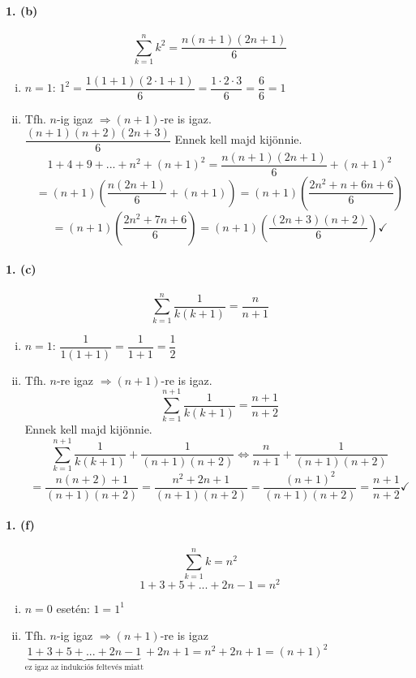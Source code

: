 \documentclass[12pt,a4paper,fleqn]{article}
\newcommand{\myparagraph}[1]{\paragraph{#1}\mbox{}}
\begin{document}
\myparagraph{1. (b)}
\[ \sum_{k=1}^{n} k^2 = \dfrac{n(n+1)(2n+1)}{6} \]
\begin{enumerate}[i.]
  \item $n=1$: $1^2 = \dfrac{1(1+1)(2 \cdot 1 + 1)}{6} = \dfrac{1 \cdot 2 \cdot 3}{6}
    = \dfrac{6}{6} = 1$ \checkmark
  \item Tfh. $n$-ig igaz $\Rightarrow (n+1)$-re is igaz. \\[1.2em]
  $ \dfrac{(n+1)(n+2)(2n+3)}{6} $ Ennek kell majd kijönnie.
  \[ 1 + 4 + 9 + ... + n^2 + (n+1)^2 = \dfrac{n(n+1)(2n+1)}{6} + (n+1)^2 \]
  \[ = (n+1) \left( \dfrac{n(2n+1)}{6} + (n+1) \right) = (n+1) \left( \dfrac{2n^2+n+6n+6}{6} \right) \]
  \[
    = (n+1) \left( \dfrac{2n^2+7n+6}{6} \right)
    = (n+1) \left( \dfrac{(2n+3)(n+2)}{6} \right) \checkmark
  \]
\end{enumerate}


\myparagraph{1. (c)}
\[ \sum_{k=1}^{n} \dfrac{1}{k(k+1)} = \dfrac{n}{n+1} \]
\begin{enumerate}[i.]
  \item $n=1$: $\dfrac{1}{1(1+1)} = \dfrac{1}{1+1} = \dfrac{1}{2}$
  \item Tfh. $n$-re igaz $\Rightarrow (n+1)$-re is igaz.
  \[ \sum_{k=1}^{n+1} \dfrac{1}{k(k+1)} = \dfrac{n+1}{n+2} \]
  Ennek kell majd kijönnie.
  \[ \sum_{k=1}^{n+1} \dfrac{1}{k(k+1)} + \dfrac{1}{(n+1)(n+2)} \iff \dfrac{n}{n+1}
    + \dfrac{1}{(n+1)(n+2)}
  \]
  \[ = \dfrac{n(n+2)+1}{(n+1)(n+2)} = \dfrac{n^2+2n+1}{(n+1)(n+2)}
    = \dfrac{(n+1)^2}{(n+1)(n+2)} = \dfrac{n+1}{n+2} \checkmark \]

\end{enumerate}

\myparagraph{1. (f)}
\[ \sum_{k=1}^{n} k = n^2 \]
\[ 1+3+5+...+2n-1 = n^2 \]
\begin{enumerate}[i.]
  \item $n=0$ esetén: $1=1^1$ \checkmark
  \item Tfh. $n$-ig igaz $\Rightarrow (n+1)$-re is igaz \\
    $\underbrace{1+3+5+...+2n-1}_{\text{ez igaz az indukciós feltevés miatt}}
    + 2n+1 = n^2 + 2n + 1 = (n+1)^2$ \checkmark
\end{enumerate}
\end{document}
